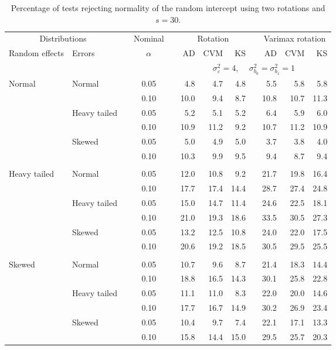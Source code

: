 \begin{table}[ht]
\centering
\caption{\label{tab:fixedsimb030} Percentage of tests rejecting normality of the random intercept using two rotations and $s = 30$.}
\begin{scriptsize}
\begin{tabular}{ll p{.1cm} c p{.1cm} rrr p{.1cm} rrr}
  \hline
  \multicolumn{2}{c}{Distributions}& & Nominal & &  \multicolumn{3}{c}{Rotation} & & \multicolumn{3}{c}{Varimax rotation} \\ \cline{1-2} \cline{6-8} \cline{10-12}   
  Random effects & Errors & & $\alpha$ & & AD & CVM & KS & & AD & CVM & KS \\ 
   \hline
& && && \multicolumn{7}{c}{$\sigma_{\varepsilon}^2 = 4$, \ \ $\sigma_{b_0}^2 = \sigma_{b_1}^2 = 1$} \\ \cline{6-12}
\rowcolor{gray!20} Normal & Normal &  & 0.05 &  & 4.8 & 4.7 & 4.8 &  & 5.5 & 5.8 & 5.8 \\ 
\rowcolor{gray!20}    &  &  & 0.10 &  & 10.0 & 9.4 & 8.7 &  & 10.8 & 10.7 & 11.3 \\ 
\rowcolor{gray!20}    & Heavy tailed &  & 0.05 &  & 5.2 & 5.1 & 5.2 &  & 6.4 & 5.9 & 6.0 \\ 
\rowcolor{gray!20}    &  &  & 0.10 &  & 10.9 & 11.2 & 9.2 &  & 10.7 & 11.2 & 10.9 \\ 
\rowcolor{gray!20}    & Skewed &  & 0.05 &  & 5.0 & 4.9 & 5.0 &  & 3.7 & 3.8 & 4.0 \\ 
\rowcolor{gray!20}    &  &  & 0.10 &  & 10.3 & 9.9 & 9.5 &  & 9.4 & 8.7 & 9.4 \\ 
&&&&&&&&&&&\\
  Heavy tailed & Normal &  & 0.05 &  & 12.0 & 10.8 & 9.2 &  & 21.7 & 19.8 & 16.4 \\ 
   &  &  & 0.10 &  & 17.7 & 17.4 & 14.4 &  & 28.7 & 27.4 & 24.8 \\ 
   & Heavy tailed &  & 0.05 &  & 15.0 & 14.7 & 11.4 &  & 24.6 & 22.5 & 18.1 \\ 
   &  &  & 0.10 &  & 21.0 & 19.3 & 18.6 &  & 33.5 & 30.5 & 27.3 \\ 
   & Skewed &  & 0.05 &  & 13.2 & 12.5 & 10.8 &  & 24.0 & 22.0 & 17.5 \\ 
   &  &  & 0.10 &  & 20.6 & 19.2 & 18.5 &  & 30.5 & 29.5 & 25.5 \\ 
&&&&&&&&&&&\\   
  Skewed & Normal &  & 0.05 &  & 10.7 & 9.6 & 8.7 &  & 21.4 & 18.3 & 14.4 \\ 
   &  &  & 0.10 &  & 18.8 & 16.5 & 14.3 &  & 30.1 & 25.8 & 22.8 \\ 
   & Heavy tailed &  & 0.05 &  & 11.1 & 11.0 & 8.3 &  & 22.0 & 20.0 & 14.6 \\ 
   &  &  & 0.10 &  & 17.7 & 16.7 & 14.9 &  & 30.2 & 26.9 & 23.4 \\ 
   & Skewed &  & 0.05 &  & 10.4 & 9.7 & 7.4 &  & 22.1 & 17.1 & 13.3 \\ 
   &  &  & 0.10 &  & 15.8 & 14.4 & 15.0 &  & 29.5 & 25.7 & 20.3 \\ 


\end{tabular}
\end{scriptsize}
\end{table}
